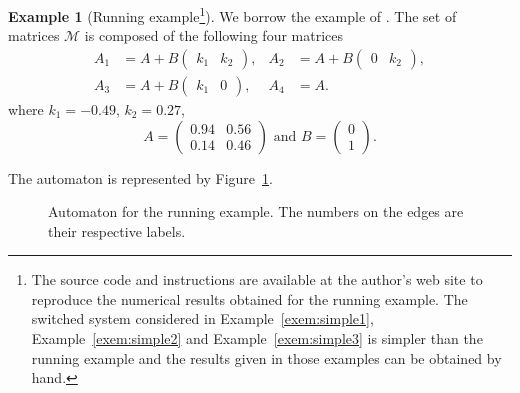 \documentclass{sig-alternate-05-2015}
\newcommand{\1}{\mathbf{1}}
\theoremstyle{definition}
\newtheorem{myexem}{Example}
\newcommand{\A}{\mathcal{M}}
\newcommand{\Sect}{Section~}
\newcommand{\witch}{witched}
\newcommand{\arcs}{edges}
\begin{document}
\begin{myexem}[Running example\footnote{The source code and instructions are available at the author's web site
to reproduce the numerical results obtained for the running example.
The s\witch{} system considered in Example~\ref{exem:simple1}, Example~\ref{exem:simple2} and Example~\ref{exem:simple3}
is simpler than the running example and the results given in those examples can be obtained by hand.
}]
  \label{exem:run1}
  We borrow the example of \cite[\Sect4]{philippe2015stability}.
  The set of matrices $\A$ is composed of the following four matrices
  \begin{align*}
    A_1 & = A+B
    \begin{pmatrix}
      k_1 & k_2
    \end{pmatrix},&
    A_2 & = A+B
    \begin{pmatrix}
      0 & k_2
    \end{pmatrix},\\
    A_3 & = A+B
    \begin{pmatrix}
      k_1 & 0
    \end{pmatrix},&
    A_4 & = A.
  \end{align*}
  where $k_1 = -0.49$, $k_2 = 0.27$,
  \[
    A =
    \begin{pmatrix}
      0.94 & 0.56\\
      0.14 & 0.46
    \end{pmatrix} \text{ and }
    B =
    \begin{pmatrix}
      0\\
      1
    \end{pmatrix}.
  \]

  The automaton is represented by Figure~\ref{fig:run}.

  \begin{figure}[!ht]
    \centering
     \caption{Automaton for the running example.
     The numbers on the \arcs{} are their respective labels.
     }
     \label{fig:run}
  \end{figure}
\end{myexem}
\end{document}
